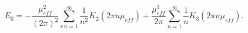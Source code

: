 \begin{equation}
E_{0}=-\frac{\mu _{eff}^{2}}{\left(2\pi \right)^{2}}\sum _{r\, n=1}^{\infty }\frac{1}{n^{2}}K_{2}\left(2\pi n\mu _{eff}\right)+\frac{\mu _{eff}^{3}}{2\pi }\sum _{n=1}^{\infty }\frac{1}{n}K_{3}\left(2\pi n\mu _{eff}\right). 
\label{eq: exact ZTCasimir energy}\end{equation}

